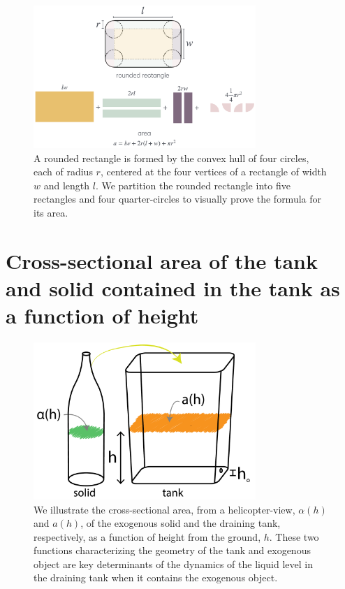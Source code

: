\documentclass[a4paper,fleqn]{cas-sc}
\begin{document}
\begin{figure}[h!]
	\centering
	\includegraphics[width=0.75\textwidth]{../drawings_and_photos/rounded_rectangle.png} 
	\caption{A rounded rectangle \cite{rounded_rect} is formed by the convex hull of four circles, each of radius $r$, centered at the four vertices of a rectangle of width $w$ and length $l$. We partition the rounded rectangle into five rectangles and four quarter-circles to visually prove the formula for its area.} \label{fig:rounded_rectangle}
\end{figure}

\clearpage

\section{Cross-sectional area of the tank and solid contained in the tank as a function of height}

\begin{figure}[h!]
	\centering
	\includegraphics[width=0.75\textwidth]{../drawings_and_photos/a_of_h.pdf} 
	\caption{We illustrate the cross-sectional area, from a helicopter-view, $\alpha(h)$ and $a(h)$, of the exogenous solid and the draining tank, respectively, as a function of height from the ground, $h$. These two functions characterizing the geometry of the tank and exogenous object are key determinants of the dynamics of the liquid level in the draining tank when it contains the exogenous object.}
\end{figure}
\end{document}

